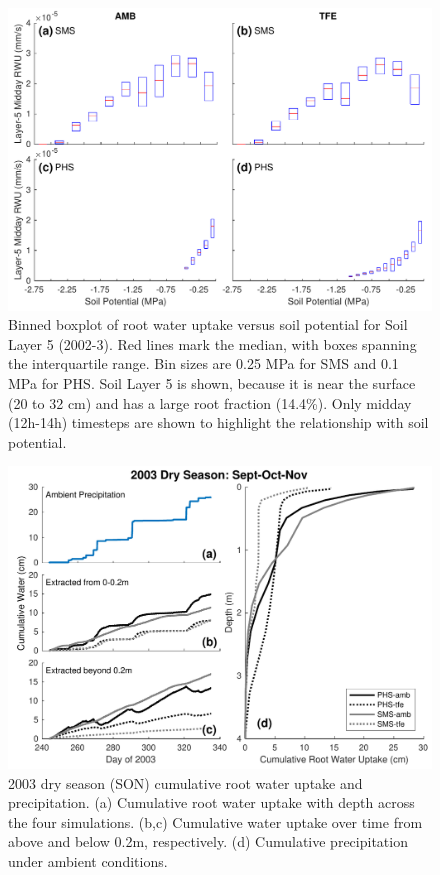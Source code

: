 \documentclass[draft,linenumbers]{agujournal}
\begin{document}
  \begin{figure}[h]
     \centering
     \includegraphics[width=30pc]{../figs3/rwu.pdf}
     \caption{Binned boxplot of root water uptake versus soil potential for Soil Layer 5 (2002-3).
     Red lines mark the median, with boxes spanning the interquartile range.
     Bin sizes are 0.25 MPa for SMS and 0.1 MPa for PHS.
     Soil Layer 5 is shown, because it is near the surface (20 to 32 cm) and has a large root fraction (14.4\%).
     Only midday (12h-14h) timesteps are shown to highlight the relationship with soil potential.}
     \label{fig:rwu}
  \end{figure}
  \clearpage
  

        \clearpage
    \begin{figure}[h]
     \centering
     \includegraphics[width=30pc]{../figs3/qdry.pdf}
     \caption{2003 dry season (SON) cumulative root water uptake and precipitation. 
     (a) Cumulative root water uptake with depth across the four simulations.
     (b,c) Cumulative water uptake over time from above and below 0.2m, respectively.
     (d) Cumulative precipitation under ambient conditions.
     }
     \label{fig:qdry}
  \end{figure}
  
\end{document}
